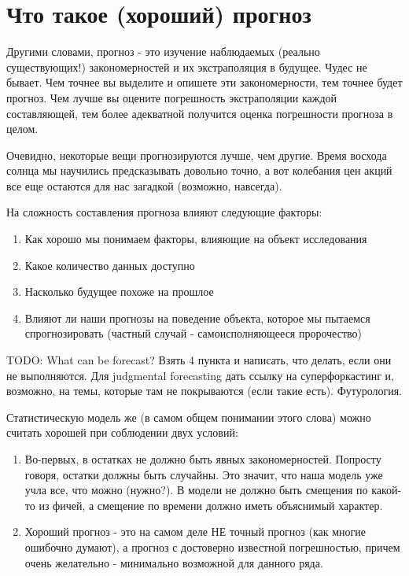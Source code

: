 \section{Что такое (хороший) прогноз}
\label{sec:forecast_quality}


Другими словами, прогноз - это изучение наблюдаемых
(реально существующих!) закономерностей и их экстраполяция в будущее.
Чудес не бывает. Чем точнее вы выделите и опишете эти закономерности,
тем точнее будет прогноз. Чем лучше вы оцените погрешность
экстраполяции каждой составляющей, тем более адекватной получится
оценка погрешности прогноза в целом.

Очевидно, некоторые вещи прогнозируются лучше, чем другие. Время восхода солнца
мы научились предсказывать довольно точно, а вот колебания цен акций
все еще остаются для нас загадкой (возможно, навсегда).

На сложность составления прогноза влияют следующие факторы:

\begin{enumerate}
  \item Как хорошо мы понимаем факторы, влияющие на объект исследования
  \item Какое количество данных доступно
  \item Насколько будущее похоже на прошлое
  \item Влияют ли наши прогнозы на поведение объекта, которое мы
    пытаемся спрогнозировать (частный случай - самоисполняющееся пророчество)
\end{enumerate}

TODO: What can be forecast? Взять 4 пункта и написать, что делать, если они
не выполняются. Для judgmental forecasting дать ссылку на
суперфоркастинг и, возможно, на темы, которые там не покрываются
(если такие есть). Футурология.

Статистическую модель же (в самом общем понимании этого слова) можно
считать хорошей при соблюдении двух условий:

\begin{enumerate}
  \item Во-первых, в остатках не должно быть явных закономерностей. Попросту
    говоря, остатки должны быть случайны. Это значит, что наша модель уже
    учла все, что можно (нужно?). В модели не должно быть смещения по
    какой-то из фичей, а смещение по времени должно иметь объяснимый характер.
  \item Хороший прогноз - это на самом деле НЕ точный прогноз
    (как многие ошибочно думают), а прогноз с достоверно известной
    погрешностью, причем очень желательно - минимально возможной для
    данного ряда.
\end{enumerate}

